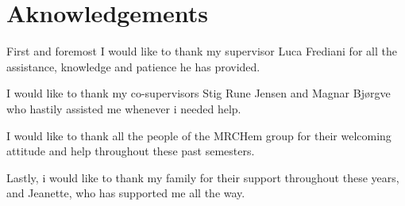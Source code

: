 \documentclass[../master_thesis.tex]{subfiles}
\begin{document}
\chapter{Aknowledgements}
First and foremost I would like to thank my supervisor Luca Frediani for all the
assistance, knowledge and patience he has provided.

I would like to thank my co-supervisors Stig Rune Jensen and Magnar Bjørgve
who hastily assisted me whenever i needed help.

I would like to thank all the people of the MRCHem group for their welcoming attitude
and help throughout these past semesters.

Lastly, i would like to thank my family for their support throughout these years,
and Jeanette, who has supported me all the way.

\biblio
\end{document}
